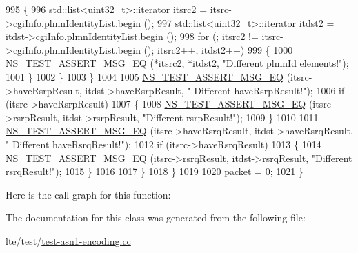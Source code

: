 \begin{DoxyCode}
995                 \{
996                   std::list<uint32\_t>::iterator itsrc2 = itsrc->cgiInfo.plmnIdentityList.begin ();
997                   std::list<uint32\_t>::iterator itdst2 = itdst->cgiInfo.plmnIdentityList.begin ();
998                   \textcolor{keywordflow}{for} (; itsrc2 != itsrc->cgiInfo.plmnIdentityList.begin (); itsrc2++, itdst2++)
999                     \{
1000                       \hyperlink{group__testing_ga2a9d78cffb3db8e867c35fff0b698cf5}{NS\_TEST\_ASSERT\_MSG\_EQ} (*itsrc2, *itdst2, \textcolor{stringliteral}{"Different plmnId
       elements!"});
1001                     \}
1002                 \}
1003             \}
1004 
1005           \hyperlink{group__testing_ga2a9d78cffb3db8e867c35fff0b698cf5}{NS\_TEST\_ASSERT\_MSG\_EQ} (itsrc->haveRsrpResult, itdst->haveRsrpResult, \textcolor{stringliteral}{"
      Different haveRsrpResult!"});
1006           \textcolor{keywordflow}{if} (itsrc->haveRsrpResult)
1007             \{
1008               \hyperlink{group__testing_ga2a9d78cffb3db8e867c35fff0b698cf5}{NS\_TEST\_ASSERT\_MSG\_EQ} (itsrc->rsrpResult, itdst->rsrpResult, \textcolor{stringliteral}{"Different
       rsrpResult!"});
1009             \}
1010 
1011           \hyperlink{group__testing_ga2a9d78cffb3db8e867c35fff0b698cf5}{NS\_TEST\_ASSERT\_MSG\_EQ} (itsrc->haveRsrqResult, itdst->haveRsrqResult, \textcolor{stringliteral}{"
      Different haveRsrqResult!"});
1012           \textcolor{keywordflow}{if} (itsrc->haveRsrqResult)
1013             \{
1014               \hyperlink{group__testing_ga2a9d78cffb3db8e867c35fff0b698cf5}{NS\_TEST\_ASSERT\_MSG\_EQ} (itsrc->rsrqResult, itdst->rsrqResult, \textcolor{stringliteral}{"Different
       rsrqResult!"});
1015             \}
1016 
1017         \}
1018     \}
1019 
1020   \hyperlink{classRrcHeaderTestCase_a6f0748c0e845f797497fbda1ca781803}{packet} = 0;
1021 \}
\end{DoxyCode}


Here is the call graph for this function\+:




The documentation for this class was generated from the following file\+:\begin{DoxyCompactItemize}
\item 
lte/test/\hyperlink{test-asn1-encoding_8cc}{test-\/asn1-\/encoding.\+cc}\end{DoxyCompactItemize}
